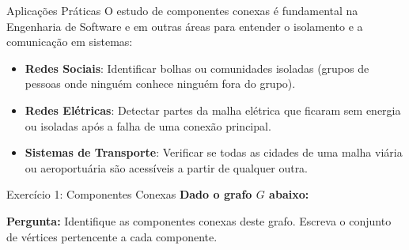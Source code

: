 \documentclass[9pt]{beamer}
\begin{document}
\begin{frame}{Aplicações Práticas}
    O estudo de componentes conexas é fundamental na Engenharia de Software e em outras áreas para entender o isolamento e a comunicação em sistemas:
    \vspace{0.5cm}
    \begin{itemize}
        \item \textbf{Redes Sociais}: Identificar bolhas ou comunidades isoladas (grupos de pessoas onde ninguém conhece ninguém fora do grupo).
        \vspace{0.3cm}
        \item \textbf{Redes Elétricas}: Detectar partes da malha elétrica que ficaram sem energia ou isoladas após a falha de uma conexão principal.
        \vspace{0.3cm}
        \item \textbf{Sistemas de Transporte}: Verificar se todas as cidades de uma malha viária ou aeroportuária são acessíveis a partir de qualquer outra.
    \end{itemize}
\end{frame}

\begin{frame}{Exercício 1: Componentes Conexas}
    \textbf{Dado o grafo $G$ abaixo:}
    \vspace{0.5cm}
    \begin{center}
    \end{center}
    \vspace{0.5cm}
    \textbf{Pergunta:} Identifique as componentes conexas deste grafo. Escreva o conjunto de vértices pertencente a cada componente.
\end{frame}
\end{document}
